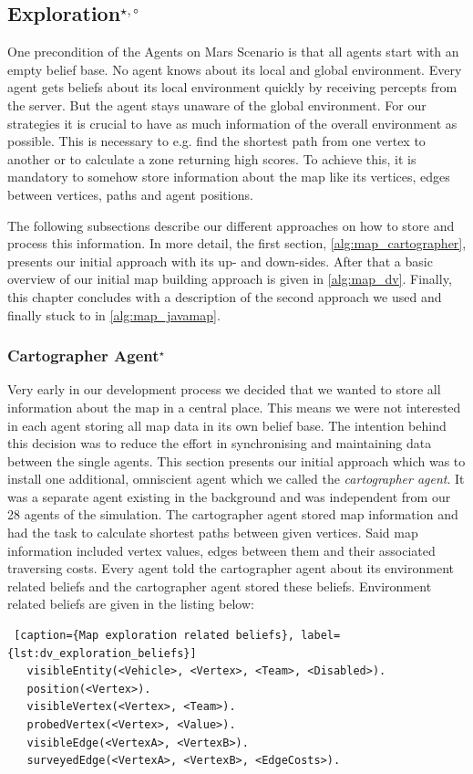 \subsection[Exploration]{Exploration$^{\star,\circ}$}\label{alg:exploration} %
One precondition of the Agents on Mars Scenario is that all agents start with an empty belief base.
No agent knows about its local and global environment.
Every agent gets beliefs about its local environment quickly by receiving percepts from the server.
But the agent stays unaware of the global environment.
For our strategies it is crucial to have as much information of the overall environment as possible.
This is necessary to e.g. find the shortest path from one vertex to another or to calculate a zone returning high scores.
To achieve this, it is mandatory to somehow store information about the map like its vertices, edges between vertices, paths and agent positions.

The following subsections describe our different approaches on how to store and process this information.
In more detail, the first section, \autoref{alg:map_cartographer}, presents our initial approach with its up- and down-sides.
After that a basic overview of our initial map building approach is given in \autoref{alg:map_dv}.
Finally, this chapter concludes with a description of the second approach we used and finally stuck to in \autoref{alg:map_javamap}.

\subsubsection[Cartographer Agent]{Cartographer Agent$^\star$}\label{alg:map_cartographer}
Very early in our development process we decided that we wanted to store all information about the map in a central place.
This means we were not interested in each agent storing all map data in its own belief base.
The intention behind this decision was to reduce the effort in synchronising and maintaining data between the single agents.
This section presents our initial approach which was to install one additional, omniscient agent which we called the \emph{cartographer agent}.
It was a separate agent existing in the background and was independent from our 28 agents of the simulation.
The cartographer agent stored map information and had the task to calculate shortest paths between given vertices.
Said map information included vertex values, edges between them and their associated traversing costs.
Every agent told the cartographer agent about its environment related beliefs and the cartographer agent stored these beliefs.
Environment related beliefs are given in the listing below:
\begin{lstlisting} [caption={Map exploration related beliefs}, label={lst:dv_exploration_beliefs}]
   visibleEntity(<Vehicle>, <Vertex>, <Team>, <Disabled>).
   position(<Vertex>).
   visibleVertex(<Vertex>, <Team>).
   probedVertex(<Vertex>, <Value>).
   visibleEdge(<VertexA>, <VertexB>).
   surveyedEdge(<VertexA>, <VertexB>, <EdgeCosts>).
\end{lstlisting}

